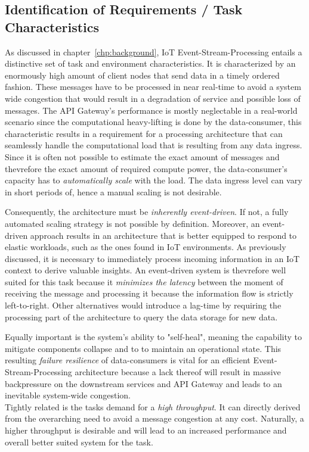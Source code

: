 \subsection{Identification of Requirements / Task Characteristics}

As discussed in chapter~\vref{chp:background}, IoT Event-Stream-Processing entails a distinctive set of task and environment characteristics. It is characterized by an enormously high amount of client nodes that send data in a timely ordered fashion. These messages have to be processed in near real-time to avoid a system wide congestion that would result in a degradation of service and possible loss of messages. The API Gateway's performance is mostly neglectable in a real-world scenario since the computational heavy-lifting is done by the data-consumer, this characteristic results in a requirement for a processing architecture that can seamlessly handle the computational load that is resulting from any data ingress.\\
Since it is often not possible to estimate the exact amount of messages and thevrefore the exact amount of required compute power, the data-consumer's capacity has to \textit{automatically scale} with the load. The data ingress level can vary in short periods of, hence a manual scaling is not desirable.

Consequently, the architecture must be \textit{inherently event-driven}. If not, a fully automated scaling strategy is not possible by definition. Moreover, an event-driven approach results in an architecture that is better equipped to respond to elastic workloads, such as the ones found in IoT environments. As previously discussed, it is necessary to immediately process incoming information in an IoT context to derive valuable insights. An event-driven system is thevrefore well suited for this task because it \textit{minimizes the latency} between the moment of receiving the message and processing it because the information flow is strictly left-to-right. Other alternatives would introduce a lag-time by requiring the processing part of the architecture to query the data storage for new data. 

Equally important is the system's ability to "self-heal", meaning the capability to mitigate components collapse and to to maintain an operational state. This resulting \textit{failure resilience} of data-consumers is vital for an efficient Event-Stream-Processing architecture because a lack thereof will result in massive backpressure on the downstream services and API Gateway and leads to an inevitable system-wide congestion.\\
Tightly related is the tasks demand for a \textit{high throughput}. It can directly derived from the overarching need to avoid a message congestion at any cost. Naturally, a higher throughput is desirable and will lead to an increased performance and overall better suited system for the task.

